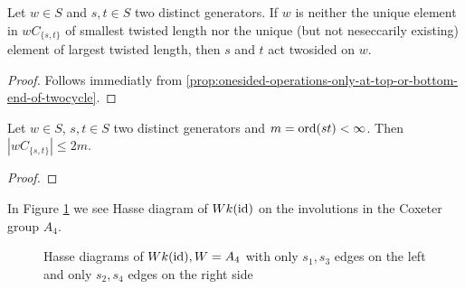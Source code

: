 \begin{coro}
	\todo
	Let $w \in S$ and $s,t \in S$ two distinct generators. If $w$ is neither the unique element in $wC_{\{s,t\}}$ of smallest twisted length nor the unique (but not neseccarily existing) element of largest twisted length, then $s$ and $t$ act twosided on $w$.

	\begin{proof}
		Follows immediatly from \ref{prop:onesided-operations-only-at-top-or-bottom-end-of-twocycle}.
	\end{proof}
\end{coro}

\begin{lemm}
	Let $w \in S$, $s,t \in S$ two distinct generators and $m = \operatorname{ord}(st) < \infty$. Then $|wC_{\{s,t\}}| \leq 2m$.

	\begin{proof}
		\todo
	\end{proof}
\end{lemm}


\begin{exam}
	In Figure \ref{fig:a4_s1s3-and-a4_s2s4} we see Hasse diagram of $Wk(\operatorname{id})$ on the involutions in the Coxeter group $A_4$.
	\begin{figure}[ht]
		\centering
		
		\quad \quad \quad
		
		\caption{Hasse diagrams of $Wk(\operatorname{id}), W = A_4$ with only $s_1,s_3$ edges on the left and only $s_2,s_4$ edges on the right side}
		\label{fig:a4_s1s3-and-a4_s2s4}
	\end{figure}
\end{exam}